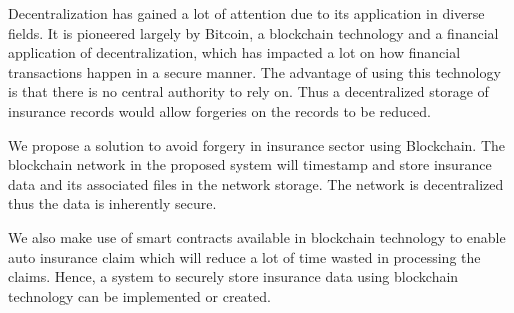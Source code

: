 \lipsum[]
Decentralization has gained a lot of attention due to its application in diverse fields. It is pioneered largely by Bitcoin, a blockchain technology and a financial application of decentralization, which has impacted a lot on how financial transactions happen in a secure manner. The advantage of using this technology is that there is no central authority to rely on. Thus a decentralized storage of insurance records would allow forgeries on the records to be reduced.

We propose a solution to avoid forgery in insurance sector using Blockchain. The blockchain network in the proposed system will timestamp and store insurance data and its associated files in the network storage. The network is decentralized thus the data is inherently secure. 

We also make use of smart contracts available in blockchain technology to enable auto insurance claim which will reduce a lot of time wasted in processing the claims. Hence, a system to securely store insurance data using blockchain technology can be implemented or created.